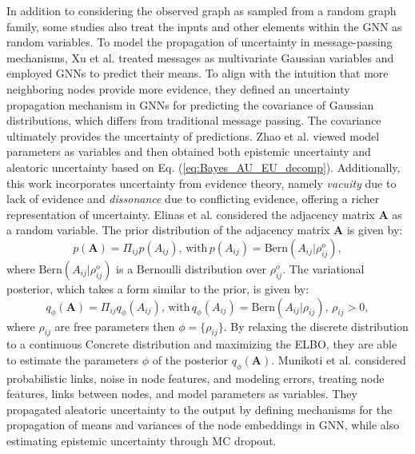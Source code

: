 In addition to considering the observed graph as sampled from a random graph family, some studies also treat the inputs and other elements within the GNN as random variables.
To model the propagation of uncertainty in message-passing mechanisms, Xu et al. \cite{xu2022uncertainty} treated messages as multivariate Gaussian variables and employed GNNs to predict their means. To align with the intuition that more neighboring nodes provide more evidence, they defined an uncertainty propagation mechanism in GNNs for predicting the covariance of Gaussian distributions, which differs from traditional message passing. The covariance ultimately provides the uncertainty of predictions. 
Zhao et al. \cite{zhao2020uncertainty} viewed model parameters as variables and then obtained both epistemic uncertainty and aleatoric uncertainty based on Eq. (\ref{eq:Bayes_AU_EU_decomp}). 
Additionally, this work incorporates uncertainty from evidence theory, namely \textit{vacuity} due to lack of evidence and \textit{dissonance} due to conflicting evidence, offering a richer representation of uncertainty. 
Elinas et al. \cite{elinas2020variational}considered the adjacency matrix $\mathbf{A}$ as a random variable. 
The prior distribution of the adjacency matrix $\mathbf{A}$ is given by:
\begin{equation}
    \label{Elinas_prior_A}
    p(\mathbf{A})=\Pi_{ij}p(A_{ij}),\,
    \text{with}\,p(A_{ij})=\text{Bern}(A_{ij}|\rho_{ij}^o), 
\end{equation}
where $\text{Bern}(A_{ij}|\rho_{ij}^o)$ is a Bernoulli distribution over $\rho_{ij}^o$. 
The variational posterior, which takes a form similar to the prior, is given by:
\begin{equation}
    \label{Elinas_var_post_A}
    q_{\phi}(\mathbf{A})=\Pi_{ij}q_{\phi}(A_{ij}),\,
    \text{with}\,q_{\phi}(A_{ij})=\text{Bern}(A_{ij}|\rho_{ij}),\, \rho_{ij}>0, 
\end{equation}
where $\rho_{ij}$ are free parameters then $\phi = \{\rho_{ij}\}$. 
By relaxing the discrete distribution to a continuous Concrete distribution \cite{jang2016categorical,maddison2016concrete} and maximizing the ELBO, they are able to estimate the parameters $\phi$ of the posterior $q_{\phi}(\mathbf{A})$. 
Munikoti et al. \cite{munikoti2023general} considered probabilistic links, noise in node features, and modeling errors, treating node features, links between nodes, and model parameters as variables. They propagated aleatoric uncertainty to the output by defining mechanisms for the propagation of means and variances of the node embeddings in GNN, while also estimating epistemic uncertainty through MC dropout. 

